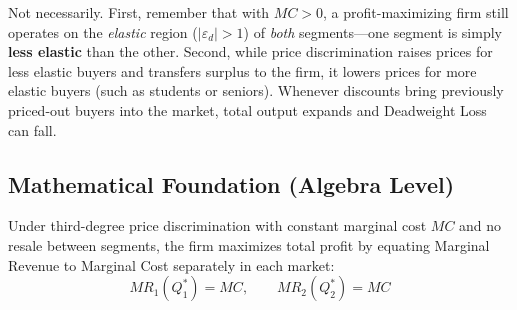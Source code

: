 \documentclass[11pt,letterpaper]{article}
\begin{document}
\begin{tcolorbox}[colback=CourseAmber!10!white,colframe=CourseOrange,title=\textbf{Clear It Up: Does Price Discrimination Always Harm Consumers?}]
Not necessarily. First, remember that with $MC > 0$, a profit-maximizing firm still operates on the \emph{elastic} region ($|\varepsilon_d| > 1$) of \emph{both} segments---one segment is simply \textbf{less elastic} than the other. Second, while price discrimination raises prices for less elastic buyers and transfers surplus to the firm, it lowers prices for more elastic buyers (such as students or seniors). Whenever discounts bring previously priced-out buyers into the market, total output expands and Deadweight Loss can fall.
\end{tcolorbox}

\subsection*{Mathematical Foundation (Algebra Level)}
Under third-degree price discrimination with constant marginal cost $MC$ and no resale between segments, the firm maximizes total profit by equating Marginal Revenue to Marginal Cost separately in each market:
\begin{equation}
MR_1(Q_1^*) = MC, \qquad MR_2(Q_2^*) = MC
\end{equation}
\end{document}
